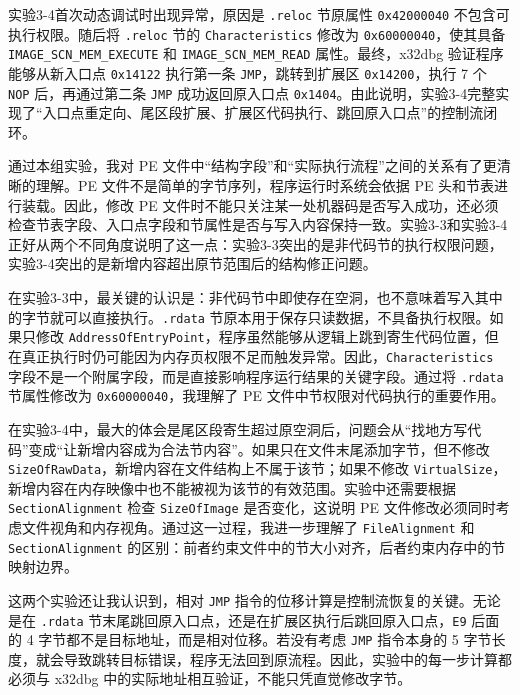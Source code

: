 ﻿\documentclass[12pt]{ctexart}
\begin{document}
实验3-4首次动态调试时出现异常，原因是 \texttt{.reloc} 节原属性 \texttt{0x42000040} 不包含可执行权限。随后将 \texttt{.reloc} 节的 \texttt{Characteristics} 修改为 \texttt{0x60000040}，使其具备 \texttt{IMAGE\_SCN\_MEM\_EXECUTE} 和 \texttt{IMAGE\_SCN\_MEM\_READ} 属性。最终，x32dbg 验证程序能够从新入口点 \texttt{0x14122} 执行第一条 \texttt{JMP}，跳转到扩展区 \texttt{0x14200}，执行 7 个 \texttt{NOP} 后，再通过第二条 \texttt{JMP} 成功返回原入口点 \texttt{0x1404}。由此说明，实验3-4完整实现了“入口点重定向、尾区段扩展、扩展区代码执行、跳回原入口点”的控制流闭环。


\vspace{1.2cm}


通过本组实验，我对 PE 文件中“结构字段”和“实际执行流程”之间的关系有了更清晰的理解。PE 文件不是简单的字节序列，程序运行时系统会依据 PE 头和节表进行装载。因此，修改 PE 文件时不能只关注某一处机器码是否写入成功，还必须检查节表字段、入口点字段和节属性是否与写入内容保持一致。实验3-3和实验3-4正好从两个不同角度说明了这一点：实验3-3突出的是非代码节的执行权限问题，实验3-4突出的是新增内容超出原节范围后的结构修正问题。

在实验3-3中，最关键的认识是：非代码节中即使存在空洞，也不意味着写入其中的字节就可以直接执行。\texttt{.rdata} 节原本用于保存只读数据，不具备执行权限。如果只修改 \texttt{AddressOfEntryPoint}，程序虽然能够从逻辑上跳到寄生代码位置，但在真正执行时仍可能因为内存页权限不足而触发异常。因此，\texttt{Characteristics} 字段不是一个附属字段，而是直接影响程序运行结果的关键字段。通过将 \texttt{.rdata} 节属性修改为 \texttt{0x60000040}，我理解了 PE 文件中节权限对代码执行的重要作用。

在实验3-4中，最大的体会是尾区段寄生超过原空洞后，问题会从“找地方写代码”变成“让新增内容成为合法节内容”。如果只在文件末尾添加字节，但不修改 \texttt{SizeOfRawData}，新增内容在文件结构上不属于该节；如果不修改 \texttt{VirtualSize}，新增内容在内存映像中也不能被视为该节的有效范围。实验中还需要根据 \texttt{SectionAlignment} 检查 \texttt{SizeOfImage} 是否变化，这说明 PE 文件修改必须同时考虑文件视角和内存视角。通过这一过程，我进一步理解了 \texttt{FileAlignment} 和 \texttt{SectionAlignment} 的区别：前者约束文件中的节大小对齐，后者约束内存中的节映射边界。

这两个实验还让我认识到，相对 \texttt{JMP} 指令的位移计算是控制流恢复的关键。无论是在 \texttt{.rdata} 节末尾跳回原入口点，还是在扩展区执行后跳回原入口点，\texttt{E9} 后面的 4 字节都不是目标地址，而是相对位移。若没有考虑 \texttt{JMP} 指令本身的 5 字节长度，就会导致跳转目标错误，程序无法回到原流程。因此，实验中的每一步计算都必须与 x32dbg 中的实际地址相互验证，不能只凭直觉修改字节。
\end{document}
